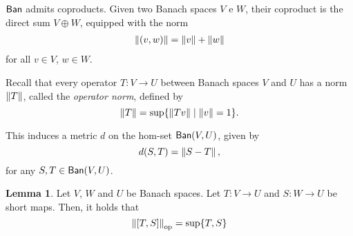 \documentclass[10pt,a4paper]{amsart}
\theoremstyle{definition}
\theoremstyle{definition}
\theoremstyle{definition}
\newtheorem{lemma}[definition]{Lemma}
\theoremstyle{definition}
\theoremstyle{definition}
\theoremstyle{definition}
\begin{document}
  
  $\mathsf{Ban}$ admits coproducts. Given two Banach spaces  $V$ e $W$, their coproduct is the direct sum $V \oplus W$, equipped with the norm
  \begin{align*}
    \left\lVert (v,w) \right\rVert = \left\lVert v \right\rVert+\left\lVert w \right\rVert
  \end{align*}
  for all  $v \in V$, $w \in W$.

  

  Recall that every operator \( T: V \to U \) between Banach spaces \( V \) and \( U \) has a norm \( \left\lVert T \right\rVert \), called the \emph{operator norm}, defined by
  \[
  \left\lVert T \right\rVert = \sup \{ \left\lVert Tv \right\rVert \mid \left\lVert v \right\rVert = 1 \}.
  \]
  
  This induces a metric \( d \) on the hom-set \( \mathsf{Ban}(V, U) \), given by
  \[
  d(S, T) = \left\lVert S - T \right\rVert,
  \]
  for any \( S, T \in \mathsf{Ban}(V, U) \).

  \begin{lemma} \label{lem_op_max_trace}
  Let $V$, $W$ and $U$ be Banach spaces. Let $ T: V \to U$ and $ S: W \to U$ be short maps. Then, it holds that 
  $$ \left\lVert [T, S] \right\rVert_{\text{op}}= \sup \{T,S\}$$
\end{lemma}
\end{document}

